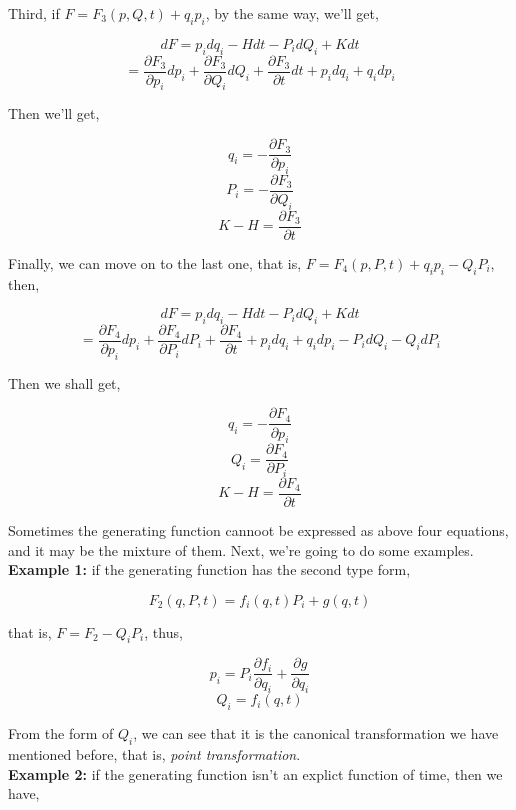 \documentclass[12pt]{article}
\begin{document}
Third, if $ F = F_3(p, Q, t) + q_ip_i $, by the same way, we'll get,

\begin{center}
    \[ dF = p_idq_i - Hdt - P_idQ_i + Kdt \]
    \[ = \frac{\partial F_3}{\partial p_i}dp_i + \frac{\partial F_3}{\partial Q_i}dQ_i + \frac{\partial F_3}{\partial t}dt + p_idq_i + q_idp_i \]
\end{center}

Then we'll get,

\begin{center}
    \[ q_i = - \frac{\partial F_3}{\partial p_i} \]
    \[ P_i = - \frac{\partial F_3}{\partial Q_i} \]
    \[ K - H = \frac{\partial F_3}{\partial t} \]
\end{center}

Finally, we can move on to the last one, that is, $F = F_4(p, P, t) + q_ip_i - Q_iP_i $, then,

\begin{center}
    \[ dF = p_idq_i - Hdt - P_idQ_i + Kdt \]
    \[ = \frac{\partial F_4}{\partial p_i}dp_i + \frac{\partial F_4}{\partial P_i}dP_i + \frac{\partial F_4}{\partial t} + p_idq_i + q_idp_i - P_idQ_i - Q_idP_i \]
\end{center}

Then we shall get,

\begin{center}
    \[ q_i = - \frac{\partial F_4}{\partial p_i} \]
    \[ Q_i = \frac{\partial F_4}{\partial P_i} \]
    \[ K - H = \frac{\partial F_4}{\partial t} \]
\end{center}

Sometimes the generating function cannoot be expressed as above four equations, and it may be the mixture of them. Next, we're going to do some examples.
\\
\indent \textbf{Example 1: }if the generating function has the second type form,

\begin{center}
    \[ F_2(q, P, t) = f_i(q, t)P_i + g(q, t) \]
\end{center}

that is, $F = F_2 - Q_iP_i $, thus, 

\begin{center}
    \[ p_i = P_i \frac{\partial f_i}{\partial q_i} + \frac{\partial g}{\partial q_i} \]
    \[ Q_i = f_i(q, t) \]
\end{center}

From the form of $Q_i$, we can see that it is the canonical transformation we have mentioned before, that is, \textit{point transformation}.
\\
\indent \textbf{Example 2: }if the generating function isn't an explict function of time, then we have,
\end{document}
